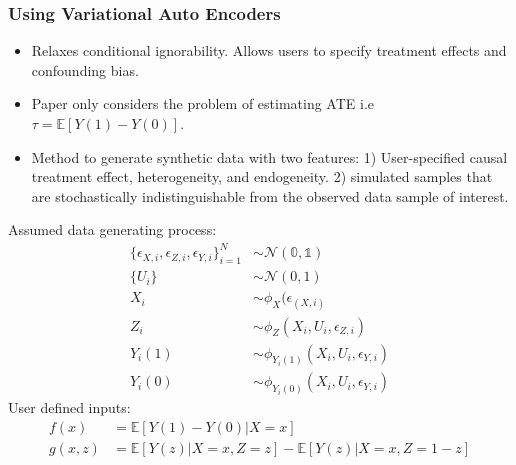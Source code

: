 \documentclass{beamer}
\begin{document}
\begin{frame}
	\frametitle{Using Variational Auto Encoders}
	\begin{itemize}
		\item Relaxes conditional ignorability. Allows users to specify treatment effects and confounding bias.
		\item Paper only considers the problem of estimating ATE i.e $ \tau = \mathbb{E}[Y(1) - Y(0)] $.
		\item Method to generate synthetic data with two features: 1) User-specified causal treatment effect, heterogeneity, and endogeneity. 2) simulated samples that are stochastically indistinguishable from the observed data sample of interest.
	\end{itemize}
\end{frame}
\begin{frame}
	Assumed data generating process:
	\begin{equation}
		\begin{split}
			\{ \epsilon_{X, i}, \epsilon_{Z, i}, \epsilon_{Y, i} \}_{i=1}^N & \sim \mathcal{N}(\mathbb{0}, \mathbb{1}) \\
			\{ U_i \} & \sim \mathcal{N}(0, 1) \\
			X_i & \sim \phi_X(\epsilon_(X, i) \\
			Z_i & \sim \phi_Z(X_i, U_i, \epsilon_{Z, i}) \\
			Y_i(1) & \sim \phi_{Y_i(1)} (X_i, U_i, \epsilon_{Y, i}) \\
			Y_i(0) & \sim \phi_{Y_i(0)} (X_i, U_i, \epsilon_{Y, i})
		\end{split}
	\end{equation}
	User defined inputs:
	\begin{equation}
		\begin{split}
			f(x) &= \mathbb{E}[Y(1) - Y(0) | X=x] \\
			g(x, z) &= \mathbb{E}[Y(z) | X=x, Z=z] - \mathbb{E}[Y(z) | X=x, Z=1-z] \\
		\end{split}
	\end{equation}
\end{frame}
\end{document}
